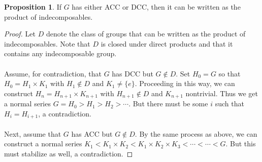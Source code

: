 \documentclass[10pt,letterpaper,cm]{nupset}
\theoremstyle{definition}
\newtheorem{prop}{Proposition}
\newcommand{\1}{\mathbf{1}}
\newcommand{\0}{\vec 0}
\begin{document}
\begin{prop}
If $G$ has either ACC or DCC, then it can be written as the product of indecomposables.
\end{prop}
\begin{proof}
Let $D$ denote the class of groups that can be written as the product of indecomposables. Note that $D$ is closed under direct products and that it contains any indecomposable group. \\ \\ Assume, for contradiction, that $G$ has DCC but $G \notin D$. Set $H_0 = G$ so that $H_0 = H_1 \times K_1$ with $H_1 \notin D$ and $K_1 \ne \{e\}$. Proceeding in this way, we can construct $H_n = H_{n+1} \times K_{n+1}$ with $H_{n+1} \notin D$ and $K_{n+1}$ nontrivial. Thus we get a normal series $G= H_0 > H_1 > H_2 > \cdots$. But there must be some $i$ such that $H_i = H_{i+1}$, a contradiction.
\\ \\ Next, assume that $G$ has ACC but $G \notin D$. By the same process as above, we can construct a normal series $K_1 < K_1 \times K_2 < K_1 \times K_2 \times K_3 < \cdots < \cdots < G$. But this must stabilize as well, a contradiction.
\end{proof}
\end{document}
